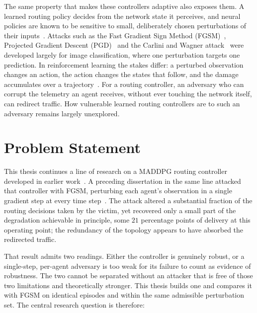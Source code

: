 The same property that makes these controllers adaptive also exposes them. A learned
routing policy decides from the network state it perceives, and neural policies are
known to be sensitive to small, deliberately chosen perturbations of their
inputs~\cite{szegedy2014intriguingpropertiesneuralnetworks,goodfellow2015explainingharnessingadversarialexamples}.
Attacks such as the Fast Gradient Sign Method
(FGSM)~\cite{goodfellow2015explainingharnessingadversarialexamples}, Projected Gradient
Descent (PGD)~\cite{madry2019deeplearningmodelsresistant} and the Carlini and Wagner
attack~\cite{carlini2017evaluatingrobustnessneuralnetworks} were developed largely for
image classification, where one perturbation targets one prediction. In reinforcement
learning the stakes differ: a perturbed observation changes an action, the action
changes the states that follow, and the damage accumulates over a
trajectory~\cite{zhang2020robust}. For a routing controller, an adversary who can
corrupt the telemetry an agent receives, without ever touching the network itself, can
redirect traffic. How vulnerable learned routing controllers are to such an adversary
remains largely unexplored.

\section{Problem Statement}
\label{sec:intro_problem}

This thesis continues a line of research on a MADDPG routing controller developed in
earlier work~\cite{amaral2026maddpg-routing}. A preceding dissertation in the same line
attacked that controller with FGSM, perturbing each agent's observation in a single
gradient step at every time step~\cite{martins2026fgsm}. The attack altered a
substantial fraction of the routing decisions taken by the victim, yet recovered only
a small part of the degradation achievable in principle, some $21$ percentage points of
delivery at this operating point; the redundancy of the topology appears to have
absorbed the redirected traffic.

That result admits two readings. Either the controller is genuinely robust, or a
single-step, per-agent adversary is too weak for its failure to count as evidence of
robustness. The two cannot be separated without an attacker that is free of those two
limitations and theoretically stronger. This thesis builds one and compares it with
FGSM on identical episodes and within the same admissible perturbation set. The central
research question is therefore:


